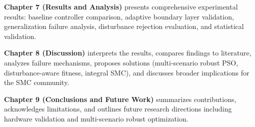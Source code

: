 \documentclass[12pt,a4paper,oneside]{report}
\begin{document}
\textbf{Chapter 7 (Results and Analysis)} presents comprehensive experimental results: baseline controller comparison, adaptive boundary layer validation, generalization failure analysis, disturbance rejection evaluation, and statistical validation.

\textbf{Chapter 8 (Discussion)} interprets the results, compares findings to literature, analyzes failure mechanisms, proposes solutions (multi-scenario robust PSO, disturbance-aware fitness, integral SMC), and discusses broader implications for the SMC community.

\textbf{Chapter 9 (Conclusions and Future Work)} summarizes contributions, acknowledges limitations, and outlines future research directions including hardware validation and multi-scenario robust optimization.







% 
% 
% 
% 




\end{document}
